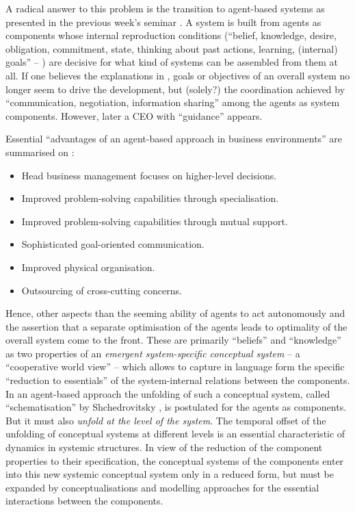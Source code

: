\documentclass[11pt,a4paper]{article}
\begin{document}
A radical answer to this problem is the transition to agent-based systems as
presented in the previous week's seminar \cite{Haertel2021}. A system is built
from agents as components whose internal reproduction conditions
(\enquote{belief, knowledge, desire, obligation, commitment, state, thinking
  about past actions, learning, (internal) goals} --
\cite[slide~9]{Haertel2021}) are decisive for what kind of systems can be
assembled from them at all. If one believes the explanations in
\cite{Haertel2021}, goals or objectives of an overall system no longer seem to
drive the development, but (solely?) the coordination achieved by
\enquote{communication, negotiation, information sharing}
\cite[slide~34]{Haertel2021} among the agents as system components. However,
later \cite[slide~35]{Haertel2021} a CEO with \enquote{guidance} appears.

Essential \enquote{advantages of an agent-based approach in business
  environments} are summarised on \cite[slide~37]{Haertel2021}:
\begin{itemize}
\item Head business management focuses on higher-level decisions.
\item Improved problem-solving capabilities through specialisation.
\item Improved problem-solving capabilities through mutual support.
\item Sophisticated goal-oriented communication.
\item Improved physical organisation.
\item Outsourcing of cross-cutting concerns.
\end{itemize}

Hence, other aspects than the seeming ability of agents to act autonomously
and the assertion that a separate optimisation of the agents leads to
optimality of the overall system come to the front. These are primarily
\enquote{beliefs} and \enquote{knowledge} as two properties of an
\emph{emergent system-specific conceptual system} -- a \enquote{cooperative
  world view} -- which allows to capture in language form the specific
\enquote{reduction to essentials} of the system-internal relations between the
components. In an agent-based approach the unfolding of such a conceptual
system, called \enquote{schematisation} by Shchedrovitsky
\cite{Shchedrovitsky2004}, is postulated for the agents as components. But it
must also \emph{unfold at the level of the system}. The temporal offset of the
unfolding of conceptual systems at different levels is an essential
characteristic of dynamics in systemic structures. In view of the reduction of
the component properties to their specification, the conceptual systems of the
components enter into this new systemic conceptual system only in a reduced
form, but must be expanded by conceptualisations and modelling approaches for
the essential interactions between the components.
\end{document}
